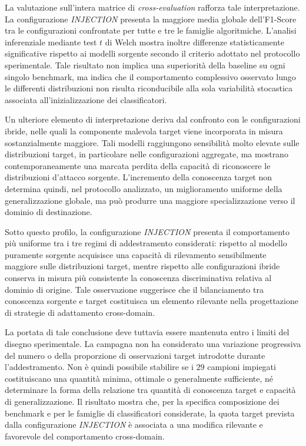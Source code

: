 La valutazione sull'intera matrice di \textit{cross-evaluation} rafforza tale interpretazione.
La configurazione \textit{INJECTION} presenta la maggiore media globale dell'F1-Score tra le configurazioni confrontate per tutte e tre le famiglie algoritmiche.
L'analisi inferenziale mediante test $t$ di Welch mostra inoltre differenze statisticamente significative rispetto ai modelli sorgente secondo il criterio adottato nel protocollo sperimentale.
Tale risultato non implica una superiorità della baseline su ogni singolo benchmark, ma indica che il comportamento complessivo osservato lungo le differenti distribuzioni non risulta riconducibile alla sola variabilità stocastica associata all'inizializzazione dei classificatori.

Un ulteriore elemento di interpretazione deriva dal confronto con le configurazioni ibride, nelle quali la componente malevola target viene incorporata in misura sostanzialmente maggiore.
Tali modelli raggiungono sensibilità molto elevate sulle distribuzioni target, in particolare nelle configurazioni aggregate, ma mostrano contemporaneamente una marcata perdita della capacità di riconoscere le distribuzioni d'attacco sorgente.
L'incremento della conoscenza target non determina quindi, nel protocollo analizzato, un miglioramento uniforme della generalizzazione globale, ma può produrre una maggiore specializzazione verso il dominio di destinazione.

Sotto questo profilo, la configurazione \textit{INJECTION} presenta il comportamento più uniforme tra i tre regimi di addestramento considerati: rispetto al modello puramente sorgente acquisisce una capacità di rilevamento sensibilmente maggiore sulle distribuzioni target, mentre rispetto alle configurazioni ibride conserva in misura più consistente la conoscenza discriminativa relativa al dominio di origine.
Tale osservazione suggerisce che il bilanciamento tra conoscenza sorgente e target costituisca un elemento rilevante nella progettazione di strategie di adattamento cross-domain.

La portata di tale conclusione deve tuttavia essere mantenuta entro i limiti del disegno sperimentale.
La campagna non ha considerato una variazione progressiva del numero o della proporzione di osservazioni target introdotte durante l'addestramento.
Non è quindi possibile stabilire se i $29$ campioni impiegati costituiscano una quantità minima, ottimale o generalmente sufficiente, né determinare la forma della relazione tra quantità di conoscenza target e capacità di generalizzazione.
Il risultato mostra che, per la specifica composizione dei benchmark e per le famiglie di classificatori considerate, la quota target prevista dalla configurazione \textit{INJECTION} è associata a una modifica rilevante e favorevole del comportamento cross-domain.

